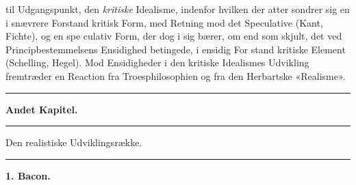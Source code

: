 \documentclass[12pt,a4paper]{book}
\newcommand{\divrule}{\begin{center}\rule{2cm}{0.4pt}\end{center}}
\begin{document}
til Udgangspunkt, den \emph{kritiske} Idealisme, indenfor hvilken
der atter sondrer sig en i snævrere Forstand kritisk Form,
med Retning mod det Speculative (Kant, Fichte), og en spe\-%
culativ Form, der dog i sig bærer, om end som skjult, det
ved Principbestemmelsens Ensidighed betingede, i ensidig For\-%
stand kritiske Element (Schelling, Hegel). Mod Ensidigheder
i den kritiske Idealismes Udvikling fremtræder en Reaction fra
Troesphilosophien og fra den Herbartske «Realisme».

\divrule

\begin{center}
  \textbf{Andet Kapitel.}
\end{center}

\divrule

\begin{center}
  {\large Den realistiske Udviklingsrække.}
\end{center}

\divrule

\begin{center}
  \textbf{1. Bacon.}
\end{center}
\end{document}
